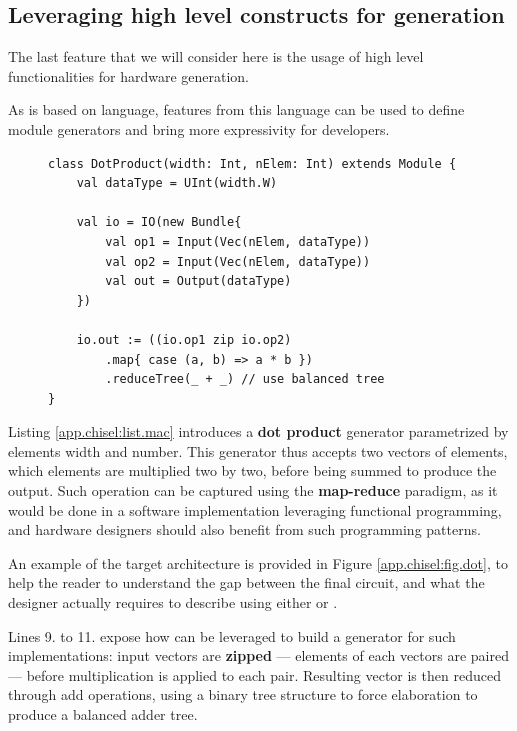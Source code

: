         \subsection*{Leveraging high level constructs for generation}
            The last feature that we will consider here is the usage of high level functionalities for hardware generation.

            As \chisel{} is based on \scala{} language, features from this language can be used to define module generators and bring more expressivity for developers.

            \begin{figure}[h!]
                \begin{lstlisting}[caption={Building a dot product kernel using \chiselT},
                                   label={app.chisel:list.mac}]
class DotProduct(width: Int, nElem: Int) extends Module {
    val dataType = UInt(width.W)

    val io = IO(new Bundle{
        val op1 = Input(Vec(nElem, dataType))
        val op2 = Input(Vec(nElem, dataType))
        val out = Output(dataType)
    })

    io.out := ((io.op1 zip io.op2)
        .map{ case (a, b) => a * b })
        .reduceTree(_ + _) // use balanced tree
}\end{lstlisting}
            \end{figure}

            Listing \ref{app.chisel:list.mac} introduces a {\bf dot product} generator parametrized by elements width and number.
            This generator thus accepts two vectors of elements, which elements are multiplied two by two, before being summed to produce the output.
            Such operation can be captured using the {\bf map-reduce} paradigm, as it would be done in a software implementation leveraging functional programming, and hardware designers should also benefit from such programming patterns.

            An example of the target architecture is provided in Figure \ref{app.chisel:fig.dot}, to help the reader to understand the gap between the final circuit, and what the designer actually requires to describe using either \chisel{} or \verilog.

            Lines 9. to 11. expose how \chisel{} can be leveraged to build a generator for such implementations: input vectors are {\bf zipped} --- \ie elements of each vectors are paired --- before multiplication is applied to each pair.
            Resulting vector is then reduced through add operations, using a binary tree structure to force elaboration to produce a balanced adder tree.

